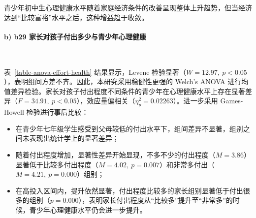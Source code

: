 \documentclass[zihao = -4, linespread = 1.5]{article}
\begin{document}
青少年初中生心理健康水平随着家庭经济条件的改善呈现整体上升趋势，但当经济达到“比较富裕”水平之后，这种增益趋于收敛。

\paragraph*{b) b29 家长对孩子付出多少与青少年心理健康}~{}

表~\ref{table-anova-effort-health} 结果显示，Levene 检验显著（$W=12.97,\ p<0.05$），表明组间方差不齐。因此，本研究采用稳健性更强的 Welch's ANOVA 进行均值差异检验。家长对孩子付出程度不同条件的青少年在心理健康水平上存在显著差异（$F=34.91,\ p<0.05$），效应量偏相关（$\eta^2_p = 0.02263$）。进一步采用 Games-Howell 检验进行事后比较：

\begin{itemize}
    \item 在青少年七年级学生感受到父母较低的付出水平下，组间差异不显著，组别之间未表现出统计学上的显著差异；
    \item 随着付出程度增加，显著性差异开始显现，不多不少的付出程度（$M=3.86$）显著低于比较多付出程度（$M=4.02,\ p=0.007$）和非常多付出（$M=4.21,\ p=0.000$）组别；
    \item 在高投入区间内，提升依然显著，付出程度比较多的家长组别显著低于付出很多的组别（$p=0.000$），表明家长付出程度从“比较多”提升至“非常多”的时候，青少年心理健康水平仍会进一步提升。
\end{itemize}
\end{document}
